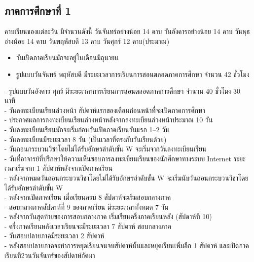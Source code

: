 \subsection{ภาคการศึกษาที่ 1}
 คาบเรียนของแต่ละวัน มีจำนวนดังนี้ วันจันทร์อย่างน้อย 14 คาบ วันอังคารอย่างน้อย 14 คาบ วันพุธอ่างน้อย 14 คาบ วันพฤหัสบดี 13 คาบ วันศุกร์ 12 คาบ(ประมาณ)
\begin{itemize}
  \item วันเปิดภาคเรียนมักจะอยู่ในเดือนมิถุนายน
  \item รูปแบบวันจันทร์ พฤหัสบดี มีระยะเวลาการเรียนการสอนตลอดภาคการศึกษา จำนวน 42 ชั่วโมง
\end{itemize}
  - รูปแบบวันอังคาร ศุกร์ มีระยะเวลาการเรียนการสอนตลอดภาคการศึกษา จำนวน 40 ชั่วโมง 30 นาที \\
  - วันลงทะเบียนเรียนล่วงหน้า สัปดาห์แรกของเดือนก่อนหน้าที่จะเปิดภาคการศึกษา \\
  - ประกาศผลการลงทะเบียนเรียนล่วงหน้าหลังจากลงทะเบียนล่วงหน้าประมาณ 10 วัน \\
  - วันลงทะเบียนเรียนมักจะเริ่มก่อนวันเปิดภาคเรียนวันแรก 1--2 วัน \\
  - วันลงทะเบียนมีระยะเวลา 8 วัน (เป็นเวลาที่ตรงกับวันเรียนด้วย) \\
  - วันถอนกระบวนวิชาโดยไม่ได้รับอักษรลำดับขั้น W จะเริ่มจากวันลงทะเบียนเรียน  \\
  - วันที่อาจารย์ที่ปรึกษาให้ความเห็นชอบการลงทะเบียนเรียนของนักศึกษาทางระบบ Internet ระยะเวลาเริ่มจาก 1 สัปดาห์หลังจากเปิดภาคเรียน \\
  - หลังจากหมดวันถอนกระบวนวิชาโดยไม่ได้รับอักษรลำดับขั้น W จะเริ่มนับวันถอนกระบวนวิชาโดยได้รับอักษรลำดับขั้น W \\
  - หลังจากเปิดภาคเรียน เมื่อเรียนครบ 8 สัปดาห์จะเริ่มสอบกลางภาค \\
  - สอบกลางภาคสัปดาห์ที่ 9 ของภาคเรียน มีระยะเวลาทั้งหมด 7 วัน \\
  - หลังจากวันสุดท้ายของการสอบกลางภาค เริ่มเรียนครึ่งภาคเรียนหลัง (สัปดาห์ที่ 10) \\
  - ครึ่งภาคเรียนหลังเวลาเรียนจะมีระยะเวลา 7 สัปดาห์ สอบกลางภาค \\
  - วันสอบปลายภาคมีระยะเวลา 2 สัปดาห์ \\
  - หลังสอบปลายภาคจะทำการหยุดเรียนจนจบสัปดาห์นั้นและหยุดเรียนเพิ่มอีก 1 สัปดาห์ และเปิดภาคเรียนที่2วนวันจันทร์ของสัปดาห์ถัดมา

